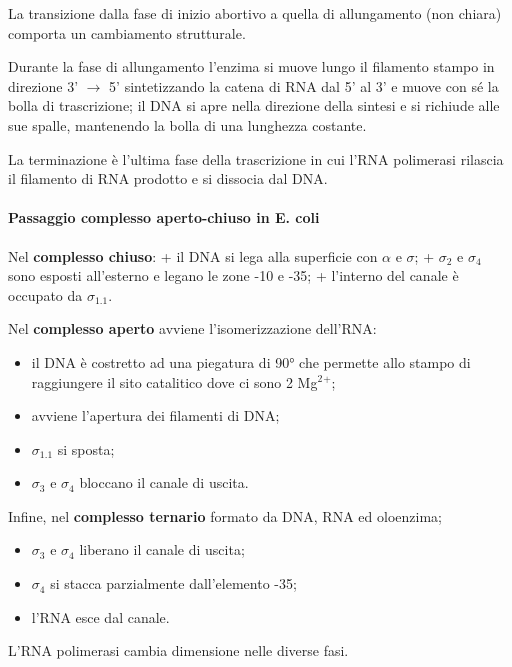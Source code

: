 \documentclass[]{article}
\begin{document}
La transizione dalla fase di inizio abortivo a quella di allungamento
(non chiara) comporta un cambiamento strutturale.

Durante la fase di allungamento l'enzima si muove lungo il filamento
stampo in direzione 3' $\rightarrow$ 5' sintetizzando la catena di RNA
dal 5' al 3' e muove con sé la bolla di trascrizione; il DNA si apre
nella direzione della sintesi e si richiude alle sue spalle, mantenendo
la bolla di una lunghezza costante.

La terminazione è l'ultima fase della trascrizione in cui l'RNA
polimerasi rilascia il filamento di RNA prodotto e si dissocia dal DNA.

\paragraph{Passaggio complesso aperto-chiuso in E.
coli}\label{passaggio-complesso-aperto-chiuso-in-e.-coli}

Nel \textbf{complesso chiuso}: + il DNA si lega alla superficie con
$\alpha$ e $\sigma$; + $\sigma$$_2$ e $\sigma$$_4$ sono esposti
all'esterno e legano le zone -10 e -35; + l'interno del canale è
occupato da $\sigma$$_1.1$.

Nel \textbf{complesso aperto} avviene l'isomerizzazione dell'RNA:

\begin{itemize}
\itemsep1pt\parskip0pt
\item
  il DNA è costretto ad una piegatura di 90° che permette allo stampo di
  raggiungere il sito catalitico dove ci sono 2 Mg$^2$$^+$;
\item
  avviene l'apertura dei filamenti di DNA;
\item
  $\sigma$$_1.1$ si sposta;
\item
  $\sigma$$_3$ e $\sigma$$_4$ bloccano il canale di uscita.
\end{itemize}

Infine, nel \textbf{complesso ternario} formato da DNA, RNA ed
oloenzima;

\begin{itemize}
\itemsep1pt\parskip0pt
\item
  $\sigma$$_3$ e $\sigma$$_4$ liberano il canale di uscita;
\item
  $\sigma$$_4$ si stacca parzialmente dall'elemento -35;
\item
  l'RNA esce dal canale.
\end{itemize}

L'RNA polimerasi cambia dimensione nelle diverse fasi.
\end{document}
